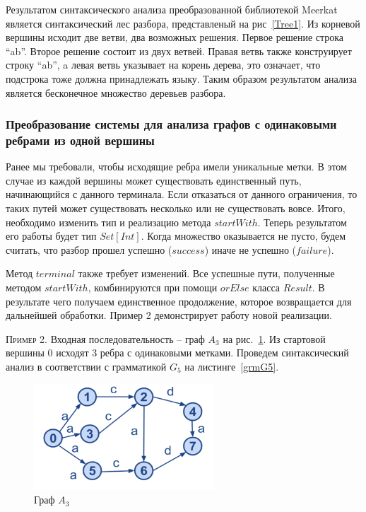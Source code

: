 Результатом синтаксического анализа преобразованной библиотекой Meerkat является синтаксический лес разбора, представленый на рис~\ref{Tree1}. Из корневой вершины исходит две ветви, два возможных решения. Первое решение строка “ab”. Второе решение состоит из двух ветвей. Правая ветвь также конструирует строку “ab”, a левая ветвь указывает на корень дерева, это означает, что подстрока тоже должна принадлежать языку. Таким образом результатом анализа является бесконечное множество деревьев разбора.

\subsubsection{Преобразование системы для анализа графов с одинаковыми ребрами из одной вершины}


Ранее мы требовали, чтобы исходящие ребра имели уникальные метки. В этом случае из каждой вершины может существовать единственный путь, начинающийся с данного терминала. Если отказаться от данного ограничения, то таких путей может существовать несколько или не существовать вовсе. Итого, необходимо изменить тип и реализацию метода $startWith$. Теперь результатом его работы будет тип $Set[Int]$. Когда множество оказывается не пусто, будем считать, что разбор прошел успешно ($success$)
иначе не успешно ($failure$).

Метод $terminal$ также требует изменений. Все успешные пути, полученные методом $startWith$, комбинируются при помощи $orElse$ класса
$Result$. В результате чего получаем единственное продолжение, которое возвращается для дальнейшей обработки. Пример 2 демонстрирует работу новой реализации.

\textsc{Пример 2.} 
Входная последовательность – граф $A_3$ на рис.~\ref{Graph3}. Из стартовой вершины 0 исходят 3 ребра с одинаковыми метками. Проведем синтаксический анализ в соответствии с грамматикой $G_5$ на листинге~\ref{grmG5}.

\begin{figure}
 \centering
 \includegraphics[width=0.6\textwidth]{Smolina/pics/Graph3.png}
 \caption{Граф $A_3$}
 \label{Graph3}
\end{figure}

